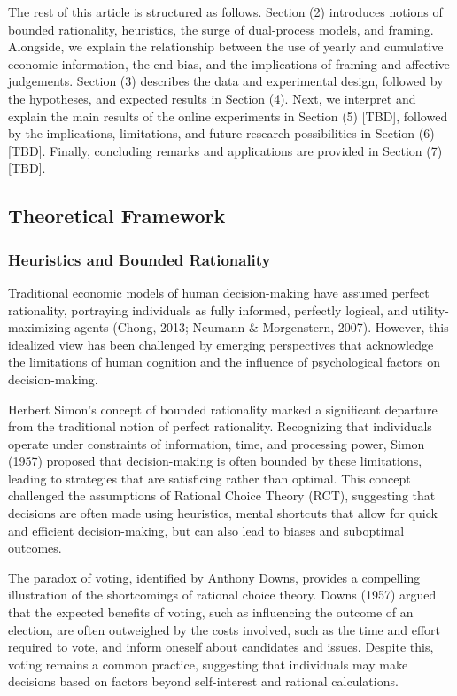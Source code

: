 \documentclass[
]{article}
\begin{document}
The rest of this article is structured as follows. Section (2)
introduces notions of bounded rationality, heuristics, the surge of
dual-process models, and framing. Alongside, we explain the relationship
between the use of yearly and cumulative economic information, the end
bias, and the implications of framing and affective judgements. Section
(3) describes the data and experimental design, followed by the
hypotheses, and expected results in Section (4). Next, we interpret and
explain the main results of the online experiments in Section (5)
{[}TBD{]}, followed by the implications, limitations, and future
research possibilities in Section (6) {[}TBD{]}. Finally, concluding
remarks and applications are provided in Section (7) {[}TBD{]}.

\hypertarget{theoretical-framework}{%
\subsection{Theoretical Framework}\label{theoretical-framework}}

\hypertarget{heuristics-and-bounded-rationality}{%
\subsubsection{Heuristics and Bounded
Rationality}\label{heuristics-and-bounded-rationality}}

Traditional economic models of human decision-making have assumed
perfect rationality, portraying individuals as fully informed, perfectly
logical, and utility-maximizing agents (Chong, 2013; Neumann \&
Morgenstern, 2007). However, this idealized view has been challenged by
emerging perspectives that acknowledge the limitations of human
cognition and the influence of psychological factors on decision-making.

Herbert Simon's concept of bounded rationality marked a significant
departure from the traditional notion of perfect rationality.
Recognizing that individuals operate under constraints of information,
time, and processing power, Simon (1957) proposed that decision-making
is often bounded by these limitations, leading to strategies that are
satisficing rather than optimal. This concept challenged the assumptions
of Rational Choice Theory (RCT), suggesting that decisions are often
made using heuristics, mental shortcuts that allow for quick and
efficient decision-making, but can also lead to biases and suboptimal
outcomes.

The paradox of voting, identified by Anthony Downs, provides a
compelling illustration of the shortcomings of rational choice theory.
Downs (1957) argued that the expected benefits of voting, such as
influencing the outcome of an election, are often outweighed by the
costs involved, such as the time and effort required to vote, and inform
oneself about candidates and issues. Despite this, voting remains a
common practice, suggesting that individuals may make decisions based on
factors beyond self-interest and rational calculations.
\end{document}
